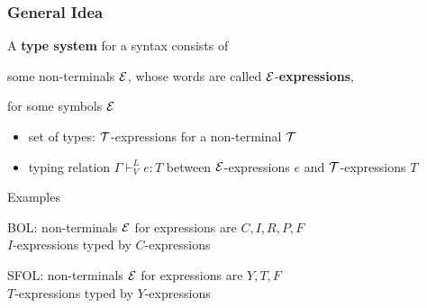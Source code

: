 \begin{frame}\frametitle{General Idea}
\begin{blockitems}{A \textbf{type system} for a syntax consists of}
 \item some non-terminals $\mathcal{E}$, whose words are called $\mathcal{E}$-\textbf{expressions},
 \item for some symbols $\mathcal{E}$
  \begin{itemize}
   \item set of types: $\mathcal{T}$-expressions for a non-terminal $\mathcal{T}$
   \item typing relation $\Gamma\vdash^L_V e:T$ between $\mathcal{E}$-expressions $e$ and $\mathcal{T}$-expressions $T$
  \end{itemize}
\end{blockitems}

\begin{blockitems}{Examples}
\item BOL: non-terminals $\mathcal{E}$ for expressions are $C,I,R,P,F$ \\
   $I$-expressions typed by $C$-expressions
\item SFOL: non-terminals $\mathcal{E}$ for expressions are $Y,T,F$ \\
 $T$-expressions typed by $Y$-expressions
\end{blockitems}
\end{frame}

